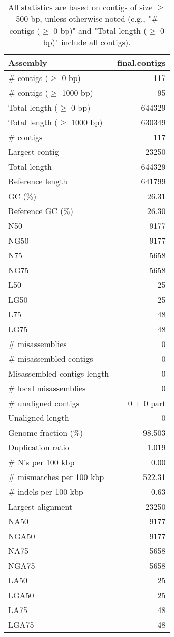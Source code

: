 \documentclass[12pt,a4paper]{article}
\begin{document}
\begin{table}[ht]
\begin{center}
\caption{All statistics are based on contigs of size $\geq$ 500 bp, unless otherwise noted (e.g., "\# contigs ($\geq$ 0 bp)" and "Total length ($\geq$ 0 bp)" include all contigs).}
\begin{tabular}{|l*{1}{|r}|}
\hline
Assembly & final.contigs \\ \hline
\# contigs ($\geq$ 0 bp) & 117 \\ \hline
\# contigs ($\geq$ 1000 bp) & 95 \\ \hline
Total length ($\geq$ 0 bp) & 644329 \\ \hline
Total length ($\geq$ 1000 bp) & 630349 \\ \hline
\# contigs & 117 \\ \hline
Largest contig & 23250 \\ \hline
Total length & 644329 \\ \hline
Reference length & 641799 \\ \hline
GC (\%) & 26.31 \\ \hline
Reference GC (\%) & 26.30 \\ \hline
N50 & 9177 \\ \hline
NG50 & 9177 \\ \hline
N75 & 5658 \\ \hline
NG75 & 5658 \\ \hline
L50 & 25 \\ \hline
LG50 & 25 \\ \hline
L75 & 48 \\ \hline
LG75 & 48 \\ \hline
\# misassemblies & 0 \\ \hline
\# misassembled contigs & 0 \\ \hline
Misassembled contigs length & 0 \\ \hline
\# local misassemblies & 0 \\ \hline
\# unaligned contigs & 0 + 0 part \\ \hline
Unaligned length & 0 \\ \hline
Genome fraction (\%) & 98.503 \\ \hline
Duplication ratio & 1.019 \\ \hline
\# N's per 100 kbp & 0.00 \\ \hline
\# mismatches per 100 kbp & 522.31 \\ \hline
\# indels per 100 kbp & 0.63 \\ \hline
Largest alignment & 23250 \\ \hline
NA50 & 9177 \\ \hline
NGA50 & 9177 \\ \hline
NA75 & 5658 \\ \hline
NGA75 & 5658 \\ \hline
LA50 & 25 \\ \hline
LGA50 & 25 \\ \hline
LA75 & 48 \\ \hline
LGA75 & 48 \\ \hline
\end{tabular}
\end{center}
\end{table}
\end{document}
